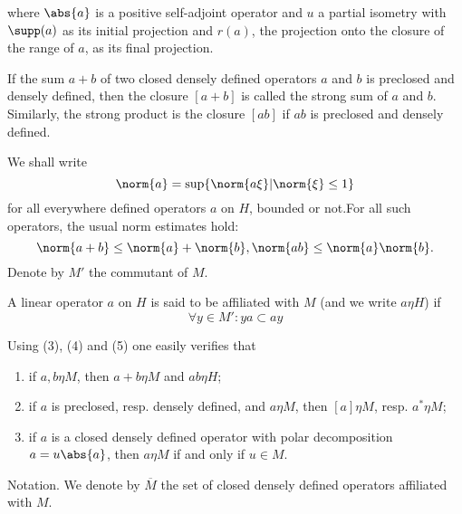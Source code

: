 where $\abs{a}$ is a positive self-adjoint operator and $u$ a partial isometry with $\supp(a)$ as its initial projection and $r(a)$, the projection onto the closure of the range of $a$, as its final projection.\par
If the sum $a+b$ of two closed densely defined operators $a$ and $b$ is preclosed and densely defined, then the closure $[a+b]$ is called the strong sum of $a$ and $b$. Similarly, the strong product is the closure $[ab]$ if $ab$ is preclosed and densely defined.\par
We shall write
\[
    \norm{a}=\sup\{\norm{a\xi}| \norm{\xi}\leq 1\}  
\]
for all everywhere defined operators $a$ on $H$, bounded or not.For all such operators, the usual norm estimates hold:
\[
    \norm{a+b}\leq \norm{a}+\norm{b}, \norm{ab}\leq \norm{a}\norm{b}.
\]
Denote by $M'$ the commutant of $M$.\par
\begin{definition}
    A linear operator $a$ on $H$ is said to be affiliated with $M$ (and we write $a\eta H$) if
\begin{equation}
    \forall y\in M':ya\subset ay
\end{equation}
\end{definition} 
\begin{remark}
    Using (3), (4) and (5) one easily verifies that
\end{remark}
\begin{enumerate}
    \item if $a,b\eta M$, then $a+b\eta M$ and $ab\eta H$;
    \item if $a$ is preclosed, resp. densely defined, and $a\eta M$, then $[a] \eta M$, resp. $a^*\eta M$;
    \item if $a$ is a closed densely defined operator with polar decomposition $a=u\abs{a}$, then $a\eta M$ if and only if $u\in M$.
\end{enumerate}
Notation. We denote by $\overline{M}$ the set of closed densely defined operators affiliated with $M$.\par

